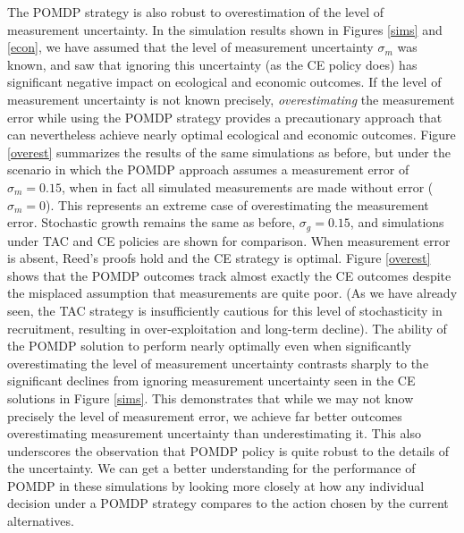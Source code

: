 \documentclass[3p]{elsarticle} %
\begin{document}
The POMDP strategy is also robust to overestimation of the level of
measurement uncertainty. In the simulation results shown in Figures
\ref{sims} and \ref{econ}, we have assumed that the level of measurement
uncertainty \(\sigma_m\) was known, and saw that ignoring this
uncertainty (as the CE policy does) has significant negative impact on
ecological and economic outcomes. If the level of measurement
uncertainty is not known precisely, \emph{overestimating} the
measurement error while using the POMDP strategy provides a
precautionary approach that can nevertheless achieve nearly optimal
ecological and economic outcomes. Figure \ref{overest} summarizes the
results of the same simulations as before, but under the scenario in
which the POMDP approach assumes a measurement error of
\(\sigma_m = 0.15\), when in fact all simulated measurements are made
without error (\(\sigma_m = 0\)). This represents an extreme case of
overestimating the measurement error. Stochastic growth remains the same
as before, \(\sigma_g = 0.15\), and simulations under TAC and CE
policies are shown for comparison. When measurement error is absent,
Reed's proofs hold and the CE strategy is optimal. Figure \ref{overest}
shows that the POMDP outcomes track almost exactly the CE outcomes
despite the misplaced assumption that measurements are quite poor. (As
we have already seen, the TAC strategy is insufficiently cautious for
this level of stochasticity in recruitment, resulting in
over-exploitation and long-term decline). The ability of the POMDP
solution to perform nearly optimally even when significantly
overestimating the level of measurement uncertainty contrasts sharply to
the significant declines from ignoring measurement uncertainty seen in
the CE solutions in Figure \ref{sims}. This demonstrates that while we
may not know precisely the level of measurement error, we achieve far
better outcomes overestimating measurement uncertainty than
underestimating it. This also underscores the observation that POMDP
policy is quite robust to the details of the uncertainty. We can get a
better understanding for the performance of POMDP in these simulations
by looking more closely at how any individual decision under a POMDP
strategy compares to the action chosen by the current alternatives.
\end{document}
